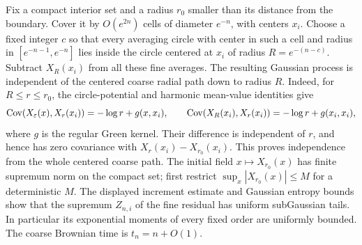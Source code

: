 Fix a compact interior set and a radius $r_0$ smaller than its distance from
the boundary.  Cover it by $O(e^{2n})$ cells of diameter $e^{-n}$, with centers
$x_i$.  Choose a fixed integer $c$ so that every averaging circle with center
in such a cell and radius in $[e^{-n-1},e^{-n}]$ lies inside the circle centered
at $x_i$ of radius $R=e^{-(n-c)}$.  Subtract $X_R(x_i)$ from all these fine
averages.  The resulting Gaussian process is independent of the centered
coarse radial path down to radius $R$.  Indeed, for $R\le r\le r_0$, the
circle-potential and harmonic mean-value identities give
\[
 \operatorname{Cov}(X_\varepsilon(x),X_r(x_i))=-\log r+g(x,x_i),\qquad
 \operatorname{Cov}(X_R(x_i),X_r(x_i))=-\log r+g(x_i,x_i),
\]
where $g$ is the regular Green kernel.  Their difference is independent of
$r$, and hence has zero covariance with
$X_r(x_i)-X_{r_0}(x_i)$.  This proves independence from the whole centered
coarse path.  The initial field $x\mapsto X_{r_0}(x)$ has finite supremum norm
on the compact set; first restrict $\sup_x|X_{r_0}(x)|\le M$ for a
deterministic $M$.
The displayed increment estimate and Gaussian entropy bounds show that the
supremum $Z_{n,i}$ of the fine residual has uniform subGaussian tails.
In particular its exponential moments of every fixed order are uniformly
bounded.  The coarse Brownian time is $t_n=n+O(1)$.

